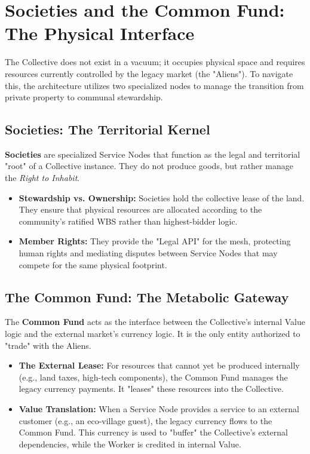 \section{Societies and the Common Fund: The Physical Interface}

The Collective does not exist in a vacuum; it occupies physical space and requires resources currently controlled by the legacy market (the "Aliens"). To navigate this, the architecture utilizes two specialized nodes to manage the transition from private property to communal stewardship.

\subsection{Societies: The Territorial Kernel}
\textbf{Societies} are specialized Service Nodes that function as the legal and territorial "root" of a Collective instance. They do not produce goods, but rather manage the \textit{Right to Inhabit}.
\begin{itemize}[leftmargin=*]
    \item \textbf{Stewardship vs. Ownership:} Societies hold the collective lease of the land. They ensure that physical resources are allocated according to the community's ratified WBS rather than highest-bidder logic.
    \item \textbf{Member Rights:} They provide the "Legal API" for the mesh, protecting human rights and mediating disputes between Service Nodes that may compete for the same physical footprint.
\end{itemize}

\subsection{The Common Fund: The Metabolic Gateway}
The \textbf{Common Fund} acts as the interface between the Collective's internal Value logic and the external market's currency logic. It is the only entity authorized to "trade" with the Aliens.
\begin{itemize}[leftmargin=*]
    \item \textbf{The External Lease:} For resources that cannot yet be produced internally (e.g., land taxes, high-tech components), the Common Fund manages the legacy currency payments. It "leases" these resources into the Collective.
    \item \textbf{Value Translation:} When a Service Node provides a service to an external customer (e.g., an eco-village guest), the legacy currency flows to the Common Fund. This currency is used to "buffer" the Collective’s external dependencies, while the Worker is credited in internal Value.
\end{itemize}

